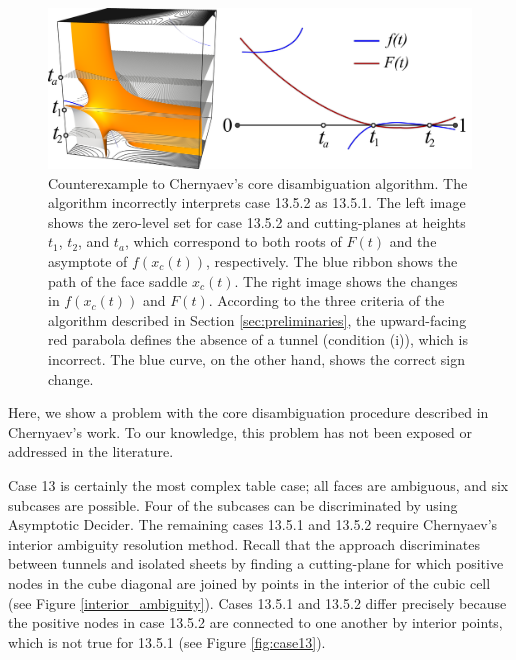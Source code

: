 \begin{figure}[b]
     \centering
     \includegraphics[width=1\linewidth]{chapter4/figures//graph.png}
     \caption{Counterexample to Chernyaev's core disambiguation algorithm. The \mc{} algorithm incorrectly interprets case 13.5.2 as 13.5.1. The left image shows the zero-level set for case 13.5.2 and cutting-planes at heights $t_1$, $t_2$, and $t_a$, which correspond to both roots of $F(t)$ and the asymptote of $f(x_c(t))$, respectively. The blue ribbon shows the path of the face saddle $x_c(t)$. The right image shows the changes in $f(x_c(t))$ and $F(t)$. According to the three criteria of the \mc{} algorithm described in Section \ref{sec:preliminaries},  the upward-facing red parabola defines the absence of a tunnel (condition (i)), which is incorrect. The blue curve, on the other hand, shows the correct sign change.}
     \label{fig:case13counter_example}
\end{figure}


Here, we show a problem with the core disambiguation procedure described in Chernyaev's work. To our knowledge, this problem has not been exposed or addressed in the literature.

Case 13 is certainly the most complex table case; all faces are ambiguous, and six subcases are possible. Four of the subcases can be discriminated by using Asymptotic Decider. The remaining cases 13.5.1 and 13.5.2 require Chernyaev's \mc{} interior ambiguity resolution method.
%
Recall that the \mc{} approach discriminates between tunnels and isolated sheets by finding a cutting-plane for which positive nodes in the cube diagonal are joined by points in the interior of the cubic cell (see Figure \ref{interior_ambiguity}). 
Cases 13.5.1 and 13.5.2 differ precisely because the positive nodes in case 13.5.2 are connected to one another by interior points, which is not true for 13.5.1 (see Figure \ref{fig:case13}).

